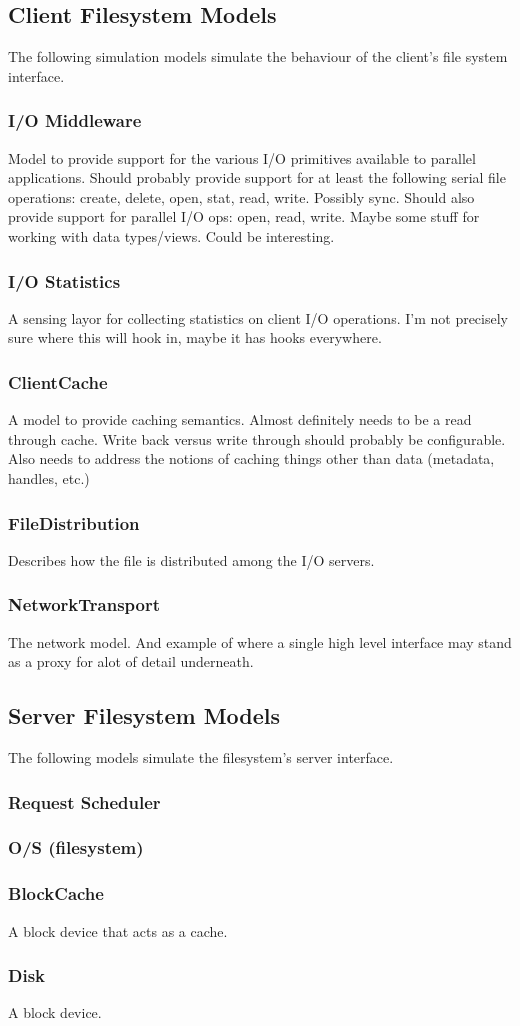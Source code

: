 \documentclass[11pt]{article}
\begin{document}
\subsection{Client Filesystem Models}
The following simulation models simulate the behaviour of the client's file
system interface.

\subsubsection{I/O Middleware}
Model to provide support for the various I/O primitives available to parallel
applications.  Should probably provide support for at least the following
serial file operations:  create, delete, open, stat, read, write.  Possibly 
sync.  Should also provide support for parallel I/O ops: open, read, write.
Maybe some stuff for working with data types/views.  Could be interesting.

\subsubsection{I/O Statistics}
A sensing layor for collecting statistics on client I/O operations.  I'm not
precisely sure where this will hook in, maybe it has hooks everywhere.

\subsubsection{ClientCache}
A model to provide caching semantics.  Almost definitely needs to be a read
through cache.  Write back versus write through should probably be
configurable.  Also needs to address the notions of caching things other than
data (metadata, handles, etc.)

\subsubsection{FileDistribution}
Describes how the file is distributed among the I/O servers.

\subsubsection{NetworkTransport}
The network model.  And example of where a single high level interface may
stand as a proxy for alot of detail underneath.

\subsection{Server Filesystem Models}
The following models simulate the filesystem's server interface.

\subsubsection{Request Scheduler}

\subsubsection{O/S (filesystem)}

\subsubsection{BlockCache}
A block device that acts as a cache.

\subsubsection{Disk}
A block device.
\end{document}

